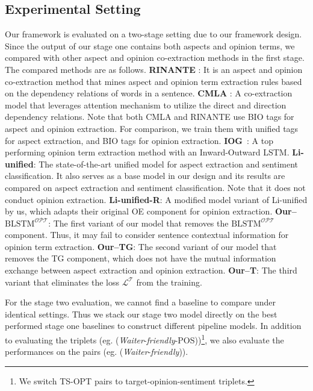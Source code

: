 \documentclass[letterpaper]{article} \usepackage{aaai20}  \usepackage{times}  \usepackage{helvet} \usepackage{courier}  \usepackage[hyphens]{url}  \usepackage{graphicx} \urlstyle{rm} \def\UrlFont{\rm}  \usepackage{graphicx}  \frenchspacing  \setlength{\pdfpagewidth}{8.5in}  \setlength{\pdfpageheight}{11in}
\begin{document}
\begin{table*}[t]
\begin{small}
\end{small}
\end{table*}

\subsection{Experimental Setting}

Our framework is evaluated on a two-stage setting due to our framework design. Since the output of our stage one contains both aspects and opinion terms, we compared with other aspect and opinion co-extraction methods in the first stage. The compared methods are as follows. \textbf{RINANTE} \cite{dai2019neural}: It is an aspect and opinion co-extraction method that mines aspect and opinion term extraction rules based on the dependency relations of words in a sentence. \textbf{CMLA} \cite{wang2017coupled}: A co-extraction model that leverages attention mechanism to utilize the direct and direction dependency relations. Note that both CMLA and RINANTE use BIO tags for aspect and opinion extraction. For comparison, we train them with unified tags for aspect extraction, and BIO tags for opinion extraction. 
     \textbf{IOG}~\cite{fan2019target}: A top performing opinion term extraction method with an Inward-Outward LSTM.
     \textbf{Li-unified}: \cite{li2019unified} The state-of-the-art unified model for aspect extraction and sentiment classification. It also serves as a base model in our design and its results are compared on aspect extraction and sentiment classification. Note that it does not conduct opinion extraction.
     \textbf{Li-unified-R}: A modified model variant of Li-unified by us, which adapts their original OE component for opinion extraction.
     \textbf{Our--$\text{BLSTM}^{\mathcal{OPT}}$}: The first variant of our model that removes the $\text{BLSTM}^{\mathcal{OPT}}$ component. Thus, it may fail to consider sentence contextual information for opinion term extraction.
     \textbf{Our--TG}: The second variant of our model that removes the TG component, which does not have the mutual information exchange between aspect extraction and opinion extraction.
     \textbf{Our--T}: The third variant that eliminates the loss $\mathcal{L}^{\mathcal{T}}$ from the training.



For the stage two evaluation, we cannot find a baseline to compare under identical settings. Thus we stack our stage two model directly on the best performed stage one baselines to construct different pipeline models. In addition to evaluating the triplets (eg. (\textit{Waiter}-\textit{friendly}-POS))\footnote{We switch TS-OPT pairs to target-opinion-sentiment triplets.}, we also evaluate the performances on the pairs (eg. (\textit{Waiter}-\textit{friendly})).
\end{document}
